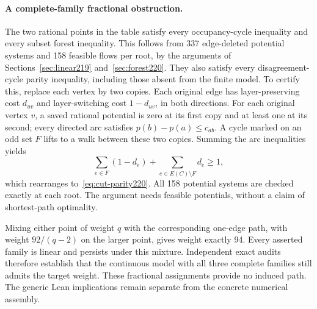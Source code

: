 \documentclass[11pt,a4paper]{article}
\theoremstyle{definition}
\theoremstyle{remark}
\begin{document}
\paragraph{A complete-family fractional obstruction.}
The two rational points in the table satisfy every occupancy-cycle
inequality and every subset forest inequality. This follows from 337
edge-deleted potential systems and 158 feasible flows per root, by the
arguments of Sections~\ref{sec:linear219} and~\ref{sec:forest220}.
They also satisfy every disagreement-cycle parity inequality, including
those absent from the finite model. To certify this, replace each vertex
by two copies. Each original edge has layer-preserving cost $d_{uv}$
and layer-switching cost $1-d_{uv}$, in both directions. For each original
vertex $v$, a saved rational potential is zero at its first copy and
at least one at its second; every directed arc satisfies
$p(b)-p(a)\le c_{ab}$. A cycle marked on an odd set $F$ lifts to a walk
between these two copies. Summing the arc inequalities yields
\[
\sum_{e\in F}(1-d_e)+\sum_{e\in E(C)\setminus F}d_e\ge1,
\]
which rearranges to~\eqref{eq:cut-parity220}. All 158 potential systems
are checked exactly at each root. The argument needs feasible potentials,
without a claim of shortest-path optimality.

Mixing either point of weight $q$ with the corresponding one-edge path,
with weight $92/(q-2)$ on the larger point, gives weight exactly 94.
Every asserted family is linear and persists under this mixture.
Independent exact audits therefore establish that the continuous model
with all three complete families still admits the target weight.
These fractional assignments provide no induced path. The generic Lean
implications remain separate from the concrete numerical assembly.
\end{document}
